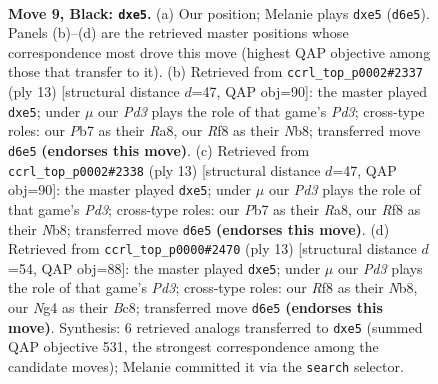 \documentclass[11pt]{article}
\begin{document}
\clearpage

\begin{figure}[p]\centering
\begin{subfigure}{0.46\textwidth}\centering
\resizebox{\linewidth}{!}{%
\newchessgame
\chessboard[
  setfen={rnbq1rk1/ppp3bp/3p1pp1/4P3/2P1P1n1/2N2N1P/PP2BPP1/1RBQK2R b K - 0 9},
  showmover=false,
  pgfstyle=straightmove, color=movearrow, markmove={d6-e5}
]}
\caption{}
\end{subfigure}\hfill
\begin{subfigure}{0.46\textwidth}\centering
\resizebox{\linewidth}{!}{%
\newchessgame
\chessboard[
  setfen={rnbq1rk1/ppp2pbp/3p1np1/4P3/2P1P3/2N2N2/PP2BPPP/R1BQK2R b KQ - 0 7},
  showmover=false,
  pgfstyle=straightmove, color=movearrow, markmove={d6-e5}
]}
\caption{}
\end{subfigure}
\\[4pt]
\begin{subfigure}{0.46\textwidth}\centering
\resizebox{\linewidth}{!}{%
\newchessgame
\chessboard[
  setfen={rnbq1rk1/ppp2pbp/3p1np1/4P3/2P1P3/2N2N2/PP2BPPP/R1BQK2R b KQ - 0 7},
  showmover=false,
  pgfstyle=straightmove, color=movearrow, markmove={d6-e5}
]}
\caption{}
\end{subfigure}\hfill
\begin{subfigure}{0.46\textwidth}\centering
\resizebox{\linewidth}{!}{%
\newchessgame
\chessboard[
  setfen={rnbq1rk1/ppp2pbp/3p1np1/4P3/2P1P3/2N2N1P/PP3PP1/R1BQKB1R b KQ - 0 7},
  showmover=false,
  pgfstyle=straightmove, color=movearrow, markmove={d6-e5}
]}
\caption{}
\end{subfigure}
\caption{\textbf{Move 9, Black: \texttt{dxe5}.} (a) Our position; Melanie plays \texttt{dxe5} (\texttt{d6e5}). Panels (b)--(d) are the retrieved master positions whose correspondence most drove this move (highest QAP objective among those that transfer to it). (b) Retrieved from \texttt{ccrl\_top\_p0002\#2337} (ply 13) [structural distance $d$=47, QAP obj=90]: the master played \texttt{dxe5}; under $\mu$ our \emph{Pd3} plays the role of that game's \emph{Pd3}; cross-type roles: our \emph{P}b7 as their \emph{R}a8, our \emph{R}f8 as their \emph{N}b8; transferred move \texttt{d6e5} \textbf{(endorses this move)}. (c) Retrieved from \texttt{ccrl\_top\_p0002\#2338} (ply 13) [structural distance $d$=47, QAP obj=90]: the master played \texttt{dxe5}; under $\mu$ our \emph{Pd3} plays the role of that game's \emph{Pd3}; cross-type roles: our \emph{P}b7 as their \emph{R}a8, our \emph{R}f8 as their \emph{N}b8; transferred move \texttt{d6e5} \textbf{(endorses this move)}. (d) Retrieved from \texttt{ccrl\_top\_p0000\#2470} (ply 13) [structural distance $d$=54, QAP obj=88]: the master played \texttt{dxe5}; under $\mu$ our \emph{Pd3} plays the role of that game's \emph{Pd3}; cross-type roles: our \emph{R}f8 as their \emph{N}b8, our \emph{N}g4 as their \emph{B}c8; transferred move \texttt{d6e5} \textbf{(endorses this move)}. Synthesis: 6 retrieved analogs transferred to \texttt{dxe5} (summed QAP objective 531, the strongest correspondence among the candidate moves); Melanie committed it via the \texttt{search} selector.}
\label{fig:thought-m17}
\end{figure}
\end{document}
